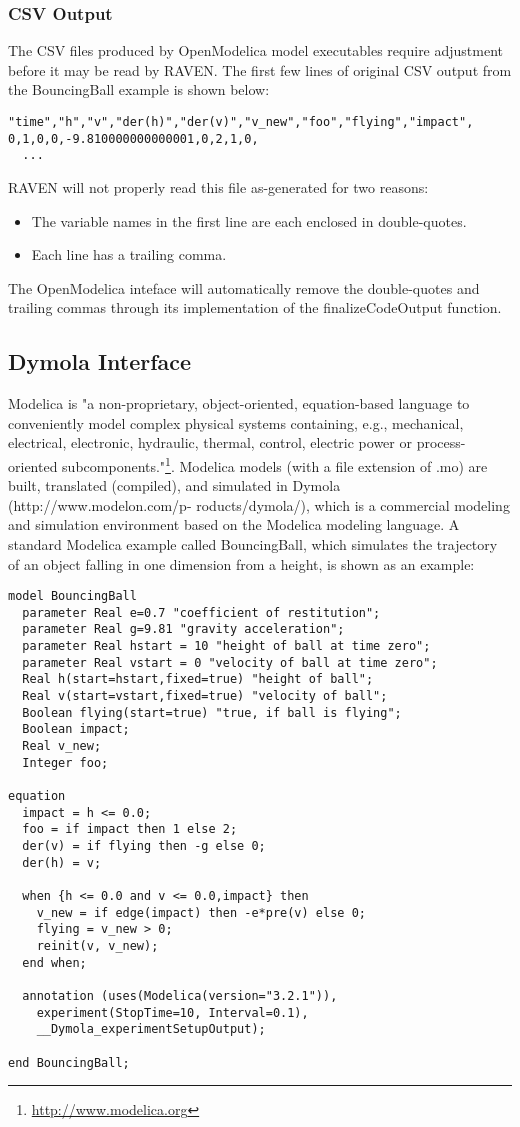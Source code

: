 \subsubsection{CSV Output}
The CSV files produced by OpenModelica model executables require adjustment before it may be read by RAVEN.
The first few lines of original CSV output from the
BouncingBall example is shown below:
\begin{lstlisting}
"time","h","v","der(h)","der(v)","v_new","foo","flying","impact",
0,1,0,0,-9.810000000000001,0,2,1,0,
  ...
\end{lstlisting}
RAVEN will not properly read this file as-generated for two reasons:
\begin{itemize}
  \item The variable names in the first line are each enclosed in double-quotes.
  \item Each line has a trailing comma.
\end{itemize}
 The OpenModelica inteface will automatically remove the double-quotes and trailing commas through its implementation of the
finalizeCodeOutput function.


\subsection{Dymola Interface}
Modelica is "a non-proprietary, object-oriented, equation-based language to conveniently model complex physical systems containing, e.g., mechanical, electrical, electronic, hydraulic,
thermal, control, electric power or process-oriented subcomponents."\footnote{\url{http://www.modelica.org}}.  Modelica models (with a file extension of .mo) are built, translated (compiled), and simulated in Dymola (http://www.modelon.com/p-
roducts/dymola/), which is a commercial modeling and simulation environment based on the Modelica modeling language.
A standard Modelica example called BouncingBall, which simulates the trajectory of an object falling in one dimension from a height, is shown as an example:
\begin{lstlisting}
model BouncingBall
  parameter Real e=0.7 "coefficient of restitution";
  parameter Real g=9.81 "gravity acceleration";
  parameter Real hstart = 10 "height of ball at time zero";
  parameter Real vstart = 0 "velocity of ball at time zero";
  Real h(start=hstart,fixed=true) "height of ball";
  Real v(start=vstart,fixed=true) "velocity of ball";
  Boolean flying(start=true) "true, if ball is flying";
  Boolean impact;
  Real v_new;
  Integer foo;

equation
  impact = h <= 0.0;
  foo = if impact then 1 else 2;
  der(v) = if flying then -g else 0;
  der(h) = v;

  when {h <= 0.0 and v <= 0.0,impact} then
    v_new = if edge(impact) then -e*pre(v) else 0;
    flying = v_new > 0;
    reinit(v, v_new);
  end when;

  annotation (uses(Modelica(version="3.2.1")),
    experiment(StopTime=10, Interval=0.1),
    __Dymola_experimentSetupOutput);

end BouncingBall;
\end{lstlisting}

